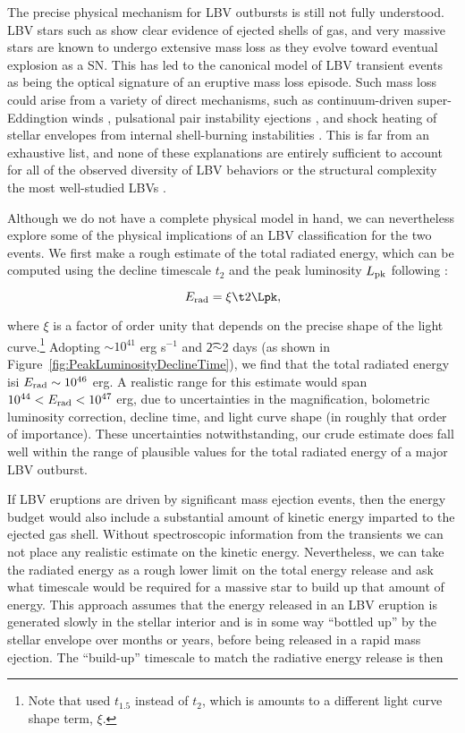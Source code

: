 The precise physical mechanism for LBV outbursts is still not fully
understood.  LBV stars such as \etacar show clear evidence of ejected
shells of gas, and very massive stars are known to undergo extensive
mass loss as they evolve toward eventual explosion as a SN.  This has
led to the canonical model of LBV transient events as being the
optical signature of an eruptive mass loss episode.  Such mass loss
could arise from a variety of direct mechanisms, such as
continuum-driven super-Eddingtion winds \citep{Smith:2006},
pulsational pair instability ejections \citep{Woosley:2007}, and shock
heating of stellar envelopes from internal shell-burning instabilities
\citep{Dessart:2010}.  This is far from an exhaustive list, and none
of these explanations are entirely sufficient to account for all of
the observed diversity of LBV behaviors or the structural complexity
the most well-studied LBVs \citep[e.g.][]{Smith:2011b, Kochanek:2012}.

Although we do not have a complete physical model in hand, we can
nevertheless explore some of the physical implications of an LBV
classification for the two \spock events.  We first make a rough
estimate of the total radiated energy, which can be computed using the
decline timescale $t_2$ and the peak luminosity $L_{\rm pk}$ following
\citet{Smith:2011b}:

\begin{equation}
  \label{eqn:Erad}
  E_{\rm rad} = \xi \t2 \Lpk,
\end{equation}

\noindent where $\xi$ is a factor of order unity that depends on the
precise shape of the light curve.\footnote{Note that
  \citet{Smith:2011b} used $t_{1.5}$ instead of $t_2$, which is
  amounts to a different light curve shape term, $\xi$.}  Adopting
\Lpk$\sim10^{41}$ erg s$^{-1}$ and \t2$\sim$2 days (as shown in
Figure~\ref{fig:PeakLuminosityDeclineTime}), we find that the total
radiated energy isi $E_{\rm rad}\sim10^{46}$ erg.  A realistic range
for this estimate would span $10^{44}<E_{\rm rad}<10^{47}$ erg, due to
uncertainties in the magnification, bolometric luminosity correction,
decline time, and light curve shape (in roughly that order of
importance). These uncertainties notwithstanding, our crude estimate
does fall well within the range of plausible values for the total
radiated energy of a major LBV outburst.

If LBV eruptions are driven by significant mass ejection events, then
the energy budget would also include a substantial amount of kinetic
energy imparted to the ejected gas shell. Without spectroscopic
information from the \spock transients we can not place any realistic
estimate on the kinetic energy. Nevertheless, we can take the radiated
energy as a rough lower limit on the total energy release and ask what
timescale would be required for a massive star to build up that amount
of energy. This approach assumes that the energy released in an LBV
eruption is generated slowly in the stellar interior and is in some
way ``bottled up'' by the stellar envelope over months or years,
before being released in a rapid mass ejection.  The ``build-up'' timescale to match the radiative energy release is then

